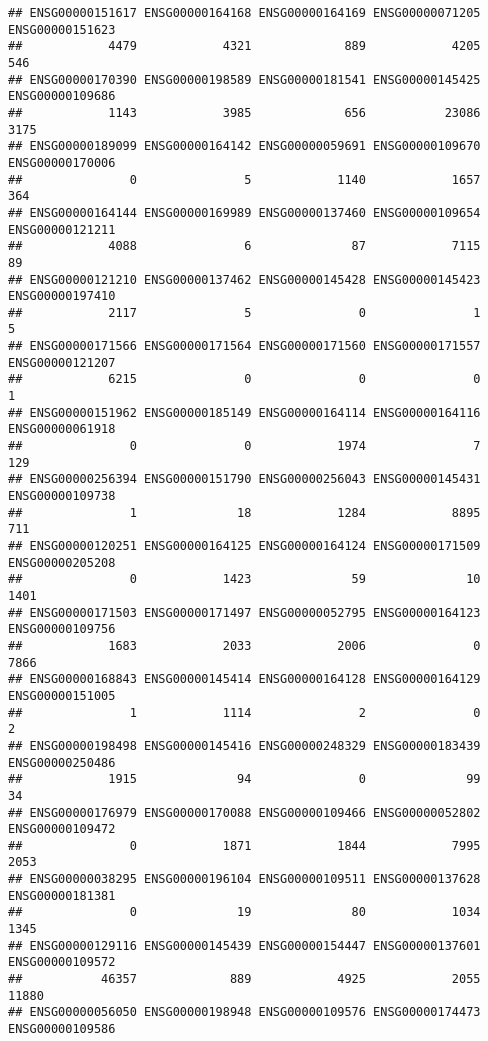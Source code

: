 \documentclass[
]{article}
\begin{document}
\begin{verbatim}
## ENSG00000151617 ENSG00000164168 ENSG00000164169 ENSG00000071205 ENSG00000151623 
##            4479            4321             889            4205             546 
## ENSG00000170390 ENSG00000198589 ENSG00000181541 ENSG00000145425 ENSG00000109686 
##            1143            3985             656           23086            3175 
## ENSG00000189099 ENSG00000164142 ENSG00000059691 ENSG00000109670 ENSG00000170006 
##               0               5            1140            1657             364 
## ENSG00000164144 ENSG00000169989 ENSG00000137460 ENSG00000109654 ENSG00000121211 
##            4088               6              87            7115              89 
## ENSG00000121210 ENSG00000137462 ENSG00000145428 ENSG00000145423 ENSG00000197410 
##            2117               5               0               1               5 
## ENSG00000171566 ENSG00000171564 ENSG00000171560 ENSG00000171557 ENSG00000121207 
##            6215               0               0               0               1 
## ENSG00000151962 ENSG00000185149 ENSG00000164114 ENSG00000164116 ENSG00000061918 
##               0               0            1974               7             129 
## ENSG00000256394 ENSG00000151790 ENSG00000256043 ENSG00000145431 ENSG00000109738 
##               1              18            1284            8895             711 
## ENSG00000120251 ENSG00000164125 ENSG00000164124 ENSG00000171509 ENSG00000205208 
##               0            1423              59              10            1401 
## ENSG00000171503 ENSG00000171497 ENSG00000052795 ENSG00000164123 ENSG00000109756 
##            1683            2033            2006               0            7866 
## ENSG00000168843 ENSG00000145414 ENSG00000164128 ENSG00000164129 ENSG00000151005 
##               1            1114               2               0               2 
## ENSG00000198498 ENSG00000145416 ENSG00000248329 ENSG00000183439 ENSG00000250486 
##            1915              94               0              99              34 
## ENSG00000176979 ENSG00000170088 ENSG00000109466 ENSG00000052802 ENSG00000109472 
##               0            1871            1844            7995            2053 
## ENSG00000038295 ENSG00000196104 ENSG00000109511 ENSG00000137628 ENSG00000181381 
##               0              19              80            1034            1345 
## ENSG00000129116 ENSG00000145439 ENSG00000154447 ENSG00000137601 ENSG00000109572 
##           46357             889            4925            2055           11880 
## ENSG00000056050 ENSG00000198948 ENSG00000109576 ENSG00000174473 ENSG00000109586 

\end{verbatim}
\end{document}
